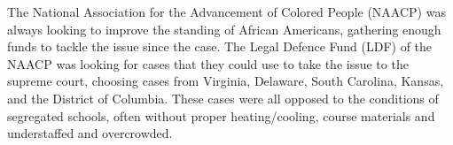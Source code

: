 The National Association for the Advancement of Colored People (NAACP) was always looking to improve the standing of African Americans, gathering enough funds to tackle the  issue since the  case.
The Legal Defence Fund (LDF) of the NAACP was looking for cases that they could use to take the issue to the supreme court, choosing cases from Virginia, Delaware, South Carolina, Kansas, and the District of Columbia.
These cases were all opposed to the conditions of segregated schools, often without proper heating/cooling, course materials and understaffed and overcrowded.